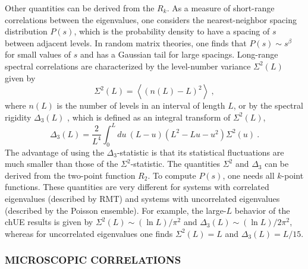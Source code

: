 Other quantities can be derived from the $R_k$.  As a measure of
short-range correlations between the eigenvalues, one considers the
nearest-neighbor spacing distribution $P(s)$, which is the probability
density to have a spacing of $s$ between adjacent levels.  In random
matrix theories, one finds that $P(s) \sim s^\beta$ for small values of
$s$ and has a Gaussian tail for large spacings.  Long-range spectral
correlations are characterized by the level-number variance
$\Sigma^2(L)$ given by
\begin{equation}
  \Sigma^2(L)=\left\langle(n(L)-L)^2\right\rangle\:,
\end{equation}
where $n(L)$ is the number of levels in an interval of length $L$, or
by the spectral rigidity $\Delta_3(L)$ \cite{deltaDM}, which is defined
as an integral transform of $\Sigma^2(L)$,
\begin{equation}
  \Delta_{3}(L)=\frac{2}{L^4}\int_0^Ldu\:(L-u)(L^2-Lu-u^2)\Sigma^2(u)\:.
\end{equation}
The advantage of using the $\Delta_3$-statistic is that its
statistical fluctuations are much smaller than those of the
$\Sigma^2$-statistic.  The quantities $\Sigma^2$ and $\Delta_3$ can be
derived from the two-point function $R_2$.  To compute $P(s)$, one
needs all $k$-point functions.  These quantities are very different
for systems with correlated eigenvalues (described by RMT) and systems
with uncorrelated eigenvalues (described by the Poisson ensemble).
For example, the large-$L$ behavior of the chUE results is given by
$\Sigma^2(L)\sim(\ln L)/\pi^2$ and $\Delta_3(L)\sim(\ln L)/2\pi^2$,
whereas for uncorrelated eigenvalues one finds $\Sigma^2(L)=L$ and
$\Delta_3(L)=L/15$.

\subsubsection{MICROSCOPIC CORRELATIONS}

